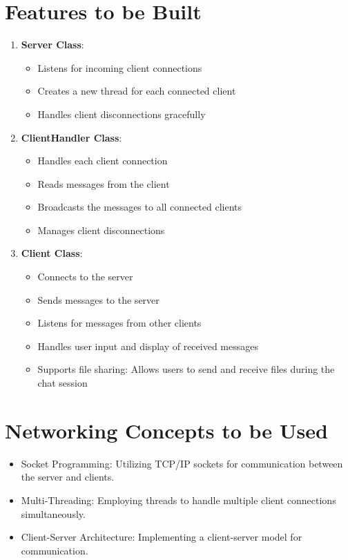 \documentclass[11pt]{article}
\begin{document}
\section{Features to be Built}
\begin{enumerate}
    \item \textbf{Server Class}:
    \begin{itemize}
        \item Listens for incoming client connections
        \item Creates a new thread for each connected client
        \item Handles client disconnections gracefully
    \end{itemize}
    
    \item \textbf{ClientHandler Class}:
    \begin{itemize}
        \item Handles each client connection
        \item Reads messages from the client
        \item Broadcasts the messages to all connected clients
        \item Manages client disconnections
    \end{itemize}
    
    \item \textbf{Client Class}:
    \begin{itemize}
        \item Connects to the server
        \item Sends messages to the server
        \item Listens for messages from other clients
        \item Handles user input and display of received messages
        \item Supports file sharing: Allows users to send and receive files during the chat session
    \end{itemize}
\end{enumerate}

\section{Networking Concepts to be Used}
\begin{itemize}
    \item Socket Programming: Utilizing TCP/IP sockets for communication between the server and clients.
    \item Multi-Threading: Employing threads to handle multiple client connections simultaneously.
    \item Client-Server Architecture: Implementing a client-server model for communication.
\end{itemize}
\end{document}
